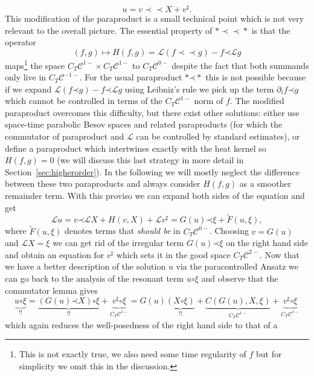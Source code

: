 \documentclass[a4paper, 11pt]{article}
\newcommand{\tmtextit}[1]{{\itshape{#1}}}
\newcommand{\para}{\mathord{\prec}}
\newcommand{\mpara}{\mathord{\prec\!\!\!\prec}}
\newcommand{\reso}{\mathord{\circ}}
\begin{document}
\begin{equation}
  u = v \mpara X + v^{\sharp} . \label{eq:ansatz}
\end{equation}
This modification of the paraproduct is a small technical point which is not very relevant to the overall
picture. The essential property of $\ast \mpara \ast$ is that the operator
\[ (f, g) \mapsto H (f, g) =\mathcal{L} (f \mpara g) - f \para \mathcal{L}g
\]
maps\footnote{This is not exactly true, we also need some time regularity of $f$ but for simplicity we omit this in the discussion.} the space $C_T \mathcal{C}^{1 -} \times C_T \mathcal{C}^{1 -}$ to $C_T
\mathcal{C}^{0 -}$ despite the fact
that both summands only live in $C_T \mathcal{C}^{- 1 -}$. For the usual
paraproduct $\ast \para \ast$ this is not possible because if we expand
$\mathcal{L} (f \para g) - f \para \mathcal{L}g$ using Leibniz's rule we pick
up the term $\partial_t f \para g$ which cannot be controlled in terms of the
$C_T \mathcal{C}^{1 -}$ norm of $f$. The modified paraproduct overcomes this
difficulty, but there exist other solutions: either use space-time parabolic Besov spaces and related paraproducts (for which the commutator of paraproduct and $\mathcal{L}$
can be controlled by standard estimates), or
define a paraproduct which intertwines exactly with the heat kernel so $H (f,
g) = 0$ (we will discuss this last strategy in more detail in
Section~\ref{sec:higherorder}). In the following we will mostly neglect the
difference between these two paraproducts and always consider $H (f, g)$ as a
smoother remainder term. With this proviso we can expand both sides
of the equation and get
\[ \mathcal{L}u = v \para \mathcal{L}X + H (v, X) +\mathcal{L}v^{\sharp} = G
   (u) \para \xi + \tilde{F} (u, \xi), \]
where $\tilde{F} (u, \xi)$ denotes terms that \tmtextit{should be} in $C_T
\mathcal{C}^{0 -}$. Choosing $v = G (u)$ and $\mathcal{L}X = \xi$ we can get
rid of the irregular term $G (u) \para \xi$ on the right hand side and obtain
an equation for $v^{\sharp}$ which sets it in the good space $C_T
\mathcal{C}^{2 -}$. Now that we have a better description of the solution $u$
via the paracontrolled Ansatz we can go back to the analysis of the resonant
term $u \reso \xi$ and observe that the commutator lemma gives
\[ \underbrace{u \reso \xi}_{!!} = \underbrace{(G (u) \para X) \reso \xi}_{!!}
   + \underbrace{v^{\sharp} \reso \xi}_{C_T \mathcal{C}^{1 -}} = G (u)
   \underbrace{(X \reso \xi)}_{!!} + \underbrace{C (G (u), X, \xi)}_{C_T
   \mathcal{C}^{1 -}} + \underbrace{v^{\sharp} \reso \xi}_{C_T \mathcal{C}^{1
   -}} \]
which again reduces the well-posedness of the right hand side to that of a
\end{document}
